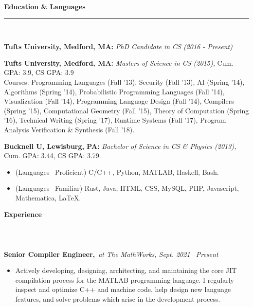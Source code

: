 {\large\bf Education \& Languages}\\[-.3cm]
\rule{\linewidth}{.5pt}\\[.2cm]
\begin{minipage}{\linewidth}

{\bf Tufts University, Medford, MA:}
{\it PhD Candidate in CS (2016 - Present)}

{\bf Tufts University, Medford, MA:}
{\it Masters of Science in CS (2015),} Cum. GPA: 3.9, CS GPA: 3.9\\
Courses: Programming Languages (Fall '13), Security (Fall '13), AI (Spring
'14), Algorithms (Spring '14), Probabilistic Programming Languages (Fall '14),
Visualization (Fall '14), Programming Language Design (Fall '14), Compilers
(Spring '15), Computational Geometry (Fall '15), Theory of Computation (Spring
'16), Technical Writing (Spring '17), Runtime Systems (Fall '17), Program
Analysis Verification \& Synthesis (Fall '18).

{\bf Bucknell U, Lewisburg, PA:}
{\it Bachelor of Science in CS \& Physics (2013),} %
Cum. GPA: 3.44, CS GPA: 3.79.\\
\end{minipage}

\vspace{-.4cm}

\begin{minipage}{\linewidth}
\begin{itemize}[leftmargin=.5cm]
\item (Languages \textemdash~Proficient) C/C++, Python, MATLAB, Haskell, Bash.
\item (Languages \textemdash~Familiar) Rust, Java, HTML, CSS, MySQL, PHP, Javascript,
Mathematica, \LaTeX.
\end{itemize}
\end{minipage}

{\large\bf Experience}\\[-.3cm]
\rule{\linewidth}{.5pt}\\[.2cm]

\vspace{-.6cm}

\begin{minipage}{\linewidth}
{\bf Senior Compiler Engineer,}{\it~at The MathWorks, Sept. 2021 \textemdash~Present}\\[-.4cm]
\begin{itemize}[leftmargin=0.5cm]
\item Actively developing, designing, architecting, and maintaining the core
JIT compilation process for the MATLAB programming language. I regularly
inspect and optimize C++ and machine code, help design new language features,
and solve problems which arise in the development process.
\end{itemize}
\end{minipage}

